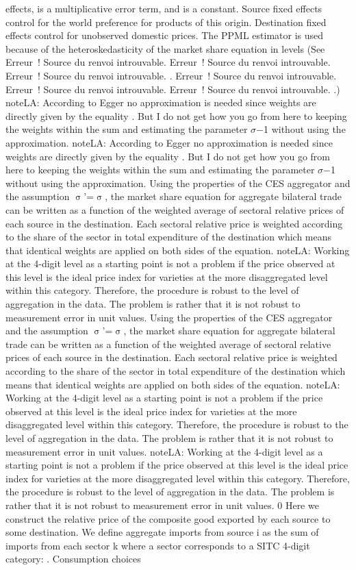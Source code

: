 \documentclass[12pt,twoside,a4paper,notitlepage]{article}
\begin{document}
effects, is a multiplicative error term, and is a constant. Source fixed effects control for the world preference for products of this origin. Destination fixed effects control for unobserved domestic prices. The PPML estimator is used because of the heteroskedasticity of the market share equation in levels (See Erreur~! Source du renvoi introuvable. Erreur~! Source du renvoi introuvable. Erreur~! Source du renvoi introuvable. . Erreur~! Source du renvoi introuvable. Erreur~! Source du renvoi introuvable. Erreur~! Source du renvoi introuvable. .) noteLA: According to Egger no approximation is needed since weights are directly given by the equality . But I do not get how you go from here to keeping the weights within the sum and estimating the parameter ${\sigma}$${-}$1 without using the approximation. noteLA: According to Egger no approximation is needed since weights are directly given by the equality . But I do not get how you go from here to keeping the weights within the sum and estimating the parameter ${\sigma}$${-}$1 without using the approximation. Using the properties of the CES aggregator and the assumption ${\upsigma}$'=${\upsigma}$, the market share equation for aggregate bilateral trade can be written as a function of the weighted average of sectoral relative prices of each source in the destination. Each sectoral relative price is weighted according to the share of the sector in total expenditure of the destination which means that identical weights are applied on both sides of the equation. noteLA: Working at the 4-digit level as a starting point is not a problem if the price observed at this level is the ideal price index for varieties at the more disaggregated level within this category. Therefore, the procedure is robust to the level of aggregation in the data. The problem is rather that it is not robust to measurement error in unit values. Using the properties of the CES aggregator and the assumption ${\upsigma}$'=${\upsigma}$, the market share equation for aggregate bilateral trade can be written as a function of the weighted average of sectoral relative prices of each source in the destination. Each sectoral relative price is weighted according to the share of the sector in total expenditure of the destination which means that identical weights are applied on both sides of the equation. noteLA: Working at the 4-digit level as a starting point is not a problem if the price observed at this level is the ideal price index for varieties at the more disaggregated level within this category. Therefore, the procedure is robust to the level of aggregation in the data. The problem is rather that it is not robust to measurement error in unit values. noteLA: Working at the 4-digit level as a starting point is not a problem if the price observed at this level is the ideal price index for varieties at the more disaggregated level within this category. Therefore, the procedure is robust to the level of aggregation in the data. The problem is rather that it is not robust to measurement error in unit values. 0 Here we construct the relative price of the composite good exported by each source to some destination. We define aggregate imports from source i as the sum of imports from each sector k where a sector corresponds to a SITC 4-digit category: . Consumption choices 
\end{document}
